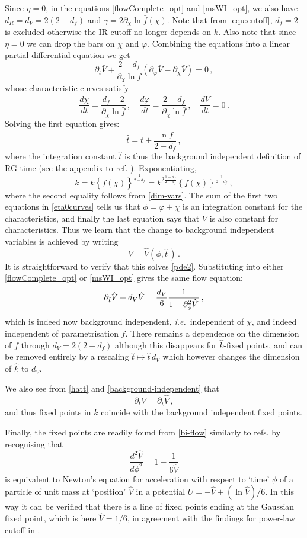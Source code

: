 \documentclass[11pt]{book} %
\newcommand\ie{\textit{i.e.}\ }
\newcommand{\vp}{\varphi}
\newcommand{\bc}{\bar \chi}
\newcommand{\bV}{\bar V}
\newcommand{\hV}{\hat V}
\newcommand{\hk}{\hat k}
\newcommand{\hatt}{\hat t}
\newcommand{\be}{\begin{equation}}
\newcommand{\ee}{\end{equation}}
\begin{document}
Since $\eta=0$, in the equations \eqref{flowComplete_opt} and \eqref{msWI_opt}, we also have $d_R=d_V=2(2-d_f)$ and $\bar{\gamma}=2\partial_{\bc}\ln\bar{f}(\bc)$. Note that from \eqref{equ:cutoff}, $d_f=2$ is excluded otherwise the IR cutoff no longer depends on $k$. Also note that since $\eta=0$ we can drop the bars on $\chi$ and $\vp$.
Combining the equations into a linear partial differential equation we get
\be
\label{pde2}
\partial_t\bV +\frac{2-d_f}{\partial_{\chi}\ln\bar{f}}\left(\partial_{\vp}\bV-\partial_{\chi}\bV\right) =0\,,
\ee
whose characteristic curves satisfy
\be
\label{eta0curves}
\frac{d\chi}{dt}=\frac{d_f-2}{\partial_{\chi}\ln\bar{f}}\,,\quad\frac{d\vp}{dt}=\frac{2-d_f}{\partial_{\chi}\ln\bar{f}}\,,\quad \frac{d\bV}{dt}=0\,.
\ee
Solving the first equation gives:
\be
\label{hatt}
\hatt = t+\frac{\ln\bar{f}}{2-d_f}\,,
\ee
where the integration constant $\hatt$ is thus the background independent definition of RG time (see the appendix to ref. \cite{Dietz:2015owa}). Exponentiating,
\be
\hk = k \left\{\bar{f}(\chi)\right\}^{\frac{1}{2-d_f}} = k^{2\frac{1-d_f}{2-d_f}} \left\{f(\chi)\right\}^{\frac{1}{2-d_f}}\,,
\ee
where the second equality follows from \eqref{dim-vars}. The sum of the first two equations in \eqref{eta0curves} tells us that $\phi=\vp+\chi$ is an integration constant for the characteristics, and finally the last equation says that $\bV$ is also constant for characteristics. Thus we learn that the change to background independent variables is achieved by writing
\be
\label{background-independent}
\bV = \hV(\phi,\hatt\,)\,.
\ee
It is straightforward to verify that this solves \eqref{pde2}. Substituting into either \eqref{flowComplete_opt} or \eqref{msWI_opt} gives the same flow equation:
\be
\label{bi-flow}
\partial_{\hatt}\hV +d_V\hV = \frac{d_V}{6}\frac{1}{1-\partial^2_\phi\hV^{\vphantom{H^H}}}\,,
\ee
which is indeed now background independent, \ie independent of $\chi$, and indeed independent of parametrisation $f$. There remains a dependence on the dimension of $f$ through $d_V = 2(2-d_f)$ although this disappears for $\hk$-fixed points, and can be removed entirely by a rescaling $\hatt\mapsto \hatt\, d_V$ which however changes the dimension of $\hat{k}$ to $d_V$.

We also see from \eqref{hatt} and \eqref{background-independent} that
\be
\partial_t \bV = \partial_{\hatt} \hV\,,
\ee
and thus fixed points in $k$ coincide with the background independent fixed points.

Finally, the fixed points are readily found from \eqref{bi-flow} similarly to refs. \cite{Dietz:2016gzg,Morris:1994jc} by recognising that
\be
\frac{d^2\hV}{d\phi^2} = 1-\frac{1}{6\hV}
\ee
is equivalent to Newton's equation for acceleration with respect to `time' $\phi$ of a particle of unit mass at `position' $\hV$ in a potential $U=-\hV+ (\ln\hV)/6$. In this way it can be verified that there is a line of fixed points ending at the Gaussian fixed point, which is here $\hV=1/6$, in agreement with the findings for power-law cutoff in \cite{Dietz:2016gzg}.
\end{document}
